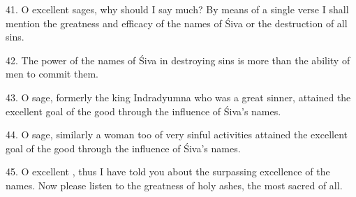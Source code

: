 41. O excellent sages, why should I say much? By means of a single verse I shall
mention the greatness and efficacy of the names of Śiva or the destruction of
all sins.

42. The power of the names of Śiva in destroying sins is more than the ability
of men to commit them.

43. O sage, formerly the king Indradyumna who was a great sinner, attained
the excellent goal of the good through the influence of Śiva’s names.

44. O sage, similarly a  woman too of very sinful activities
attained the excellent goal of the good through the influence of Śiva’s names.

45. O excellent , thus I have told you about the surpassing
excellence of the names. Now please listen to the greatness of holy ashes,
the most sacred of all.
